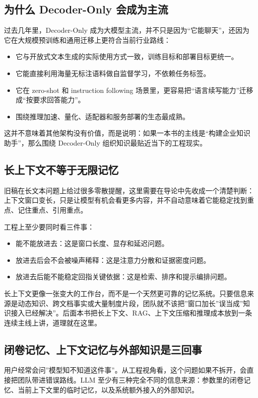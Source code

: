 \subsection{为什么 Decoder-Only 会成为主流}
过去几年里，Decoder-Only 成为大模型主流，并不只是因为“它能聊天”，还因为它在大规模预训练和通用迁移上更符合当前行业路线：
\begin{itemize}
  \item 它与开放式文本生成的实际使用方式一致，训练目标和部署目标更统一。
  \item 它能直接利用海量无标注语料做自监督学习，不依赖任务标签。
  \item 它在 zero-shot 和 instruction following 场景里，更容易把“语言续写能力”迁移成“按要求回答能力”。
  \item 围绕推理加速、量化、适配器和服务部署的生态最成熟。
\end{itemize}

这并不意味着其他架构没有价值，而是说明：如果一本书的主线是“构建企业知识助手”，那么围绕 Decoder-Only 组织知识最贴近当下的工程现实。

\subsection{长上下文不等于无限记忆}
旧稿在长文本问题上给过很多零散提醒，这里需要在导论中先收成一个清楚判断：上下文窗口变长，只是让模型有机会看更多内容，并不自动意味着它能稳定找到重点、记住重点、引用重点。

工程上至少要同时看三件事：
\begin{itemize}
  \item 能不能放进去：这是窗口长度、显存和延迟问题。
  \item 放进去后会不会被噪声稀释：这是注意力分散和证据密度问题。
  \item 放进去后能不能稳定回指关键依据：这是检索、排序和提示编排问题。
\end{itemize}

长上下文更像一张变大的工作台，而不是一个天然更可靠的记忆系统。只要信息来源是动态知识、跨文档事实或大量制度片段，团队就不该把”窗口加长”误当成”知识接入已经解决”。后面本书把长上下文、RAG、上下文压缩和推理成本放到一条连续主线上讲，道理就在这里。

\subsection{闭卷记忆、上下文记忆与外部知识是三回事}
用户经常会问”模型知不知道这件事”。从工程视角看，这个问题如果不拆开，会直接把团队带进错误路线。LLM 至少有三种完全不同的信息来源：参数里的闭卷记忆、当前上下文里的临时记忆，以及系统额外接入的外部知识。

